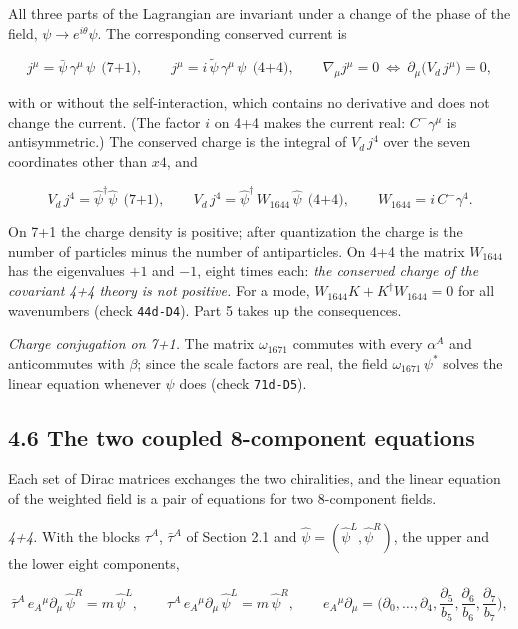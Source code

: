 \documentclass[
  10pt,
]{article}
\begin{document}
All three parts of the Lagrangian are invariant under a change of the
phase of the field, \(\psi\to e^{i\theta}\psi\). The corresponding
conserved current is

\[j^\mu=\bar\psi\,\gamma^\mu\,\psi\ \ \text{(7+1)},\qquad
j^\mu=i\,\tilde\psi\,\gamma^\mu\,\psi\ \ \text{(4+4)},\qquad
\nabla_\mu j^\mu=0\ \Longleftrightarrow\ \partial_\mu\big(V_d\,j^\mu\big)=0,\tag{4.12}\]

with or without the self-interaction, which contains no derivative and
does not change the current. (The factor \(i\) on 4+4 makes the current
real: \(C^-\gamma^\mu\) is antisymmetric.) The conserved charge is the
integral of \(V_d\,j^4\) over the seven coordinates other than \(x4\),
and

\[V_d\,j^4=\hat\psi^\dagger\hat\psi\ \ \text{(7+1)},\qquad
V_d\,j^4=\hat\psi^\dagger\,W_{1644}\,\hat\psi\ \ \text{(4+4)},\qquad W_{1644}=i\,C^-\gamma^4.\tag{4.13}\]

On 7+1 the charge density is positive; after quantization the charge is
the number of particles minus the number of antiparticles. On 4+4 the
matrix \(W_{1644}\) has the eigenvalues \(+1\) and \(-1\), eight times
each: \emph{the conserved charge of the covariant 4+4 theory is not
positive.} For a mode, \(W_{1644}K+K^\dagger W_{1644}=0\) for all
wavenumbers (check \texttt{44d-D4}). Part 5 takes up the consequences.

\emph{Charge conjugation on 7+1.} The matrix \(\omega_{1671}\) commutes
with every \(\alpha^A\) and anticommutes with \(\beta\); since the scale
factors are real, the field \(\omega_{1671}\,\psi^*\) solves the linear
equation whenever \(\psi\) does (check \texttt{71d-D5}).

\hypertarget{the-two-coupled-8-component-equations}{%
\subsection{4.6 The two coupled 8-component
equations}\label{the-two-coupled-8-component-equations}}

Each set of Dirac matrices exchanges the two chiralities, and the linear
equation of the weighted field is a pair of equations for two
8-component fields.

\emph{4+4.} With the blocks \(\tau^A\), \(\bar\tau^A\) of Section 2.1
and \(\hat\psi=(\hat\psi^L,\hat\psi^R)\), the upper and the lower eight
components,

\[\bar\tau^A\,e_A{}^\mu\partial_\mu\,\hat\psi^R=m\,\hat\psi^L,\qquad
\tau^A\,e_A{}^\mu\partial_\mu\,\hat\psi^L=m\,\hat\psi^R,\qquad
e_A{}^\mu\partial_\mu=\Big(\partial_0,\dots,\partial_4,\frac{\partial_5}{b_5},\frac{\partial_6}{b_6},\frac{\partial_7}{b_7}\Big),\tag{4.14}\]
\end{document}
